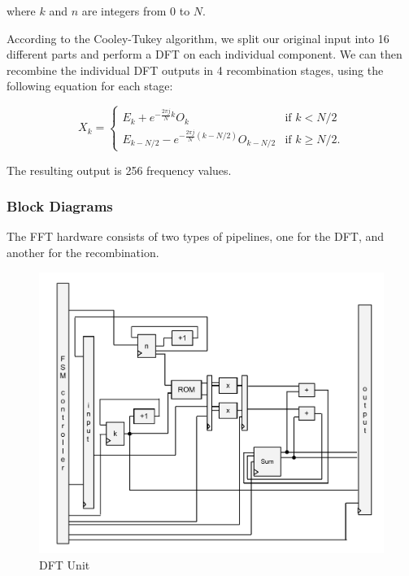 \documentclass{article}
\begin{document}
where \(k\) and \(n\) are integers from 0 to \(N\). 

According to the Cooley-Tukey algorithm, 
we split our original input into 16 different parts and perform a DFT on each
individual component. We can then recombine the individual DFT outputs in 4
recombination stages, using the following equation for each stage: 

\begin{equation}
	X_k = \left\{
	\begin{matrix}
		E_k + e^{-\frac{2\pi j}{N}k} O_k		& 	\mbox{if } k < N/2 \\ 
		E_{k-N/2} - e^{-\frac{2\pi j}{N} (k-N/2)} O_{k-N/2} & 	\mbox{if }
		k \geq N/2. 
	\end{matrix} 
	\right.
\end{equation}

The resulting output is 256 frequency values.

\newpage

\subsubsection{Block Diagrams}

The FFT hardware consists of two types of pipelines, one for the DFT,
and another for the recombination. 

\begin{figure}[H]
	\centering
	\includegraphics[scale=0.3]{dft-unit}
	\caption{DFT Unit}
\end{figure}
\end{document}
